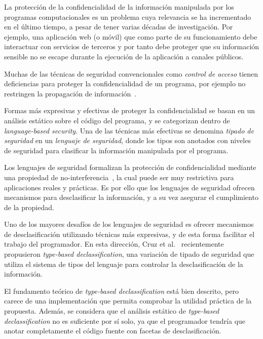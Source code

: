 \begin{intro}

	La protección de la confidencialidad de la información manipulada por los programas computacionales es un problema cuya relevancia se ha incrementado en el último tiempo, a pesar de tener varias décadas de investigación. Por ejemplo, una aplicación web (o móvil) que como parte de su funcionamiento debe interactuar con servicios de terceros y por tanto debe proteger que su información sensible no se escape durante la ejecución de la aplicación a canales públicos.

	Muchas de las técnicas de seguridad convencionales como \textit{control de acceso} tienen deficiencias para proteger la confidencialidad de un programa, por ejemplo no restringen la propagación de información~\cite{myers-phd}.

	Formas más expresivas y efectivas de proteger la confidencialidad se basan en un análisis estático sobre el código del programa, y se categorizan dentro de \textit{language-based security}. Una de las técnicas más efectivas se denomina \textit{tipado de seguridad} en un \textit{lenguaje de seguridad}, donde los tipos son anotados con niveles de seguridad para clasificar la información manipulada por el programa.

	Los lenguajes de seguridad formalizan la protección de confidencialidad mediante una propiedad de no-interferencia~\cite{noninterference}, la cual puede ser muy restrictiva para aplicaciones reales y prácticas. Es por ello que los lenguajes de seguridad ofrecen mecanismos para desclasificar la información, y a su vez asegurar el cumplimiento de la propiedad.

	Uno de los mayores desafíos de los lenguajes de seguridad es ofrecer mecanismos de desclasificación utilizando técnicas más expresivas, y de esta forma facilitar el trabajo del programador. En esta dirección, Cruz et al.~\cite{cruzAl:ecoop2017} recientemente propusieron \textit{type-based declassification}, una variación de tipado de seguridad que utiliza el sistema de tipos del lenguaje para controlar la desclasificación de la información.

	El fundamento teórico de \textit{type-based declassification} está bien descrito, pero carece de una implementación que permita comprobar la utilidad práctica de la propuesta. Además, se considera que el análisis estático de \textit{type-based declassification} no es suficiente por sí solo, ya que el programador tendría que anotar completamente el código fuente con facetas de desclasificación.


\end{intro}
